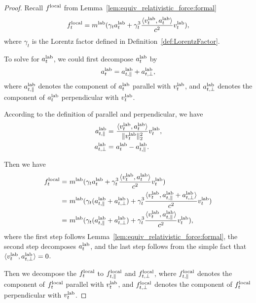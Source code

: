 \begin{proof}
Recall $f^{\rm local}$ from Lemma~\ref{lem:equiv_relativistic_force:formal}
\begin{align*}
    f_t^{\rm local} = m^{\rm lab}  (\gamma_t a_t^{\rm lab} + \gamma_t^3 \frac{ \langle v_t^{\rm lab}, a_t^{\rm lab} \rangle}{c^2} v_t^{\rm lab}),
\end{align*}
where $\gamma_t$ is the Lorentz factor defined in Definition~\ref{def:LorentzFactor}.

To solve for $a_t^{\rm lab}$, we could first decompose $a_t^{\rm lab}$ by
\begin{align*}
    a_t^{\rm lab} = a_{t,\parallel}^{\rm lab} + a_{t,\perp}^{\rm lab},
\end{align*}
where $a_{t,\parallel}^{\rm lab}$ denotes the component of $a_t^{\rm lab}$ parallel with $v_t^{\rm lab}$, and $a_{t,\perp}^{\rm lab}$ denotes the component of $a_t^{\rm lab}$ perpendicular with $v_t^{\rm lab}$.

According to the definition of parallel and perpendicular, we have
\begin{align*}
    a_{t,\parallel}^{\rm lab} = & ~ \frac{ \langle v_t^{\rm lab}, a_t^{\rm lab} \rangle}{\|v_t^{\rm lab}\|_2^2} v_t^{\rm lab}, \\
    a_{t,\perp}^{\rm lab} = & ~ a_t^{\rm lab} - a_{t,\parallel}^{\rm lab}.
\end{align*}

Then we have
\begin{align}
    f_t^{\rm local} = & ~ m^{\rm lab}  (\gamma_t a_t^{\rm lab} + \gamma_t^3 \frac{ \langle v_t^{\rm lab}, a_{t}^{\rm lab} \rangle}{c^2} v_t^{\rm lab}) \notag \\
    = & ~ m^{\rm lab}  (\gamma_t (a_{t,\parallel}^{\rm lab} + a_{t,\perp}^{\rm lab}) + \gamma_t^3 \frac{ \langle v_t^{\rm lab}, a_{t,\parallel}^{\rm lab} + a_{t,\perp}^{\rm lab} \rangle}{c^2} v_t^{\rm lab}) \notag \\
    = & ~ m^{\rm lab}  (\gamma_t (a_{t,\parallel}^{\rm lab} + a_{t,\perp}^{\rm lab}) + \gamma_t^3 \frac{ \langle v_t^{\rm lab}, a_{t,\parallel}^{\rm lab} \rangle}{c^2} v_t^{\rm lab}), \label{eq:f_split}
\end{align}
where the first step follows Lemma~\ref{lem:equiv_relativistic_force:formal}, the second step decomposes $a_t^{\rm lab}$, and the last step follows from the simple fact that $\langle v_t^{\rm lab}, a_{t,\perp}^{\rm lab} \rangle = 0$.

Then we decompose the $f_t^{\rm local}$ to $f_{t, \parallel}^{\rm local}$ and $f_{t, \perp}^{\rm local}$, where $f_{t, \parallel}^{\rm local}$ denotes the component of $f_t^{\rm local}$ parallel with $v_t^{\rm lab}$, and $f_{t,\perp}^{\rm local}$ denotes the component of $f_t^{\rm local}$ perpendicular with $v_t^{\rm lab}$.


\end{proof}
